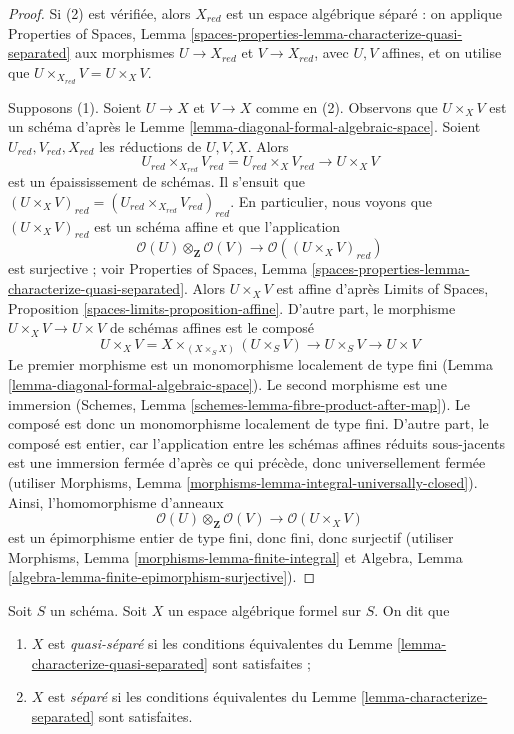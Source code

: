 \begin{proof}
Si (2) est vérifiée, alors $X_{red}$ est un espace algébrique séparé : on applique
Properties of Spaces, Lemma
\ref{spaces-properties-lemma-characterize-quasi-separated}
aux morphismes $U \to X_{red}$ et $V \to X_{red}$,
avec $U, V$ affines, et on utilise que $U \times_{X_{red}} V = U \times_X V$.

\medskip\noindent
Supposons (1). Soient $U \to X$ et $V \to X$ comme en (2).
Observons que $U \times_X V$ est un schéma d'après le
Lemme \ref{lemma-diagonal-formal-algebraic-space}.
Soient $U_{red}, V_{red}, X_{red}$ les réductions de $U, V, X$.
Alors
$$
U_{red} \times_{X_{red}} V_{red} = U_{red} \times_X V_{red} \to U \times_X V
$$
est un épaississement de schémas. Il s'ensuit que
$(U \times_X V)_{red} = (U_{red} \times_{X_{red}} V_{red})_{red}$.
En particulier, nous voyons que $(U \times_X V)_{red}$ est un schéma affine
et que l'application
$$
\mathcal{O}(U) \otimes_\mathbf{Z} \mathcal{O}(V)
\longrightarrow
\mathcal{O}((U \times_X V)_{red})
$$
est surjective ; voir Properties of Spaces, Lemma
\ref{spaces-properties-lemma-characterize-quasi-separated}.
Alors $U \times_X V$ est affine d'après
Limits of Spaces, Proposition \ref{spaces-limits-proposition-affine}.
D'autre part, le morphisme $U \times_X V \to U \times V$
de schémas affines est le composé
$$
U \times_X V = X \times_{(X \times_S X)} (U \times_S V)
\to U \times_S V \to U \times V
$$
Le premier morphisme est un monomorphisme localement de type fini
(Lemma \ref{lemma-diagonal-formal-algebraic-space}).
Le second morphisme est une immersion
(Schemes, Lemma \ref{schemes-lemma-fibre-product-after-map}).
Le composé est donc un monomorphisme localement de type fini.
D'autre part, le composé est entier, car l'application entre les schémas
affines réduits sous-jacents est une immersion fermée
d'après ce qui précède, donc universellement fermée (utiliser
Morphisms, Lemma \ref{morphisms-lemma-integral-universally-closed}).
Ainsi, l'homomorphisme d'anneaux
$$
\mathcal{O}(U) \otimes_\mathbf{Z} \mathcal{O}(V)
\longrightarrow
\mathcal{O}(U \times_X V)
$$
est un épimorphisme entier de type fini,
donc fini, donc surjectif (utiliser
Morphisms, Lemma \ref{morphisms-lemma-finite-integral}
et
Algebra, Lemma \ref{algebra-lemma-finite-epimorphism-surjective}).
\end{proof}

\begin{definition}
\label{definition-separated}
Soit $S$ un schéma. Soit $X$ un espace algébrique formel sur $S$.
On dit que
\begin{enumerate}
\item $X$ est {\it quasi-séparé} si les conditions équivalentes du
Lemme \ref{lemma-characterize-quasi-separated} sont satisfaites ;
\item $X$ est {\it séparé} si les conditions équivalentes du
Lemme \ref{lemma-characterize-separated} sont satisfaites.
\end{enumerate}
\end{definition}

